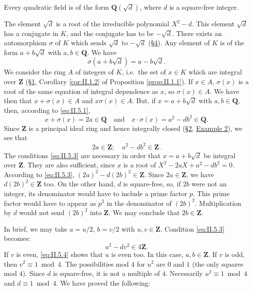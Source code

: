 \begin{proposition}
\label{prop:II.5.1}
Every quadratic field is of the form $\mathbf{Q}(\sqrt{d})$, where $d$ is a
square-free integer.
\end{proposition}

The element $\sqrt{d}$ is a root of the irreducible polynomial $X^{2}-d$.
This element $\sqrt{d}$ has a conjugate in $K$, and the conjugate has to be
$-\sqrt{d}$. There exists an automorphism $\sigma$ of $K$ which sends
$\sqrt{d}$ to $-\sqrt{d}$ (\hyperref[sec:2.4]{§4}). Any element of $K$ is of the form
$a+b\sqrt{d}$ with $a,b\in\mathbf{Q}$. We have
\begin{equation}
\sigma(a+b\sqrt{d})=a-b\sqrt{d}.
\label{eq:II.5.1}
\end{equation}
We consider the ring $A$ of integers of $K$, i.e.\ the set of $x\in K$ which
are integral over $\mathbf{Z}$ (\hyperref[sec:2.1]{§1}, Corollary \ref{cor:II.1.2} of
Proposition \ref{prop:II.1.1}). If $x\in A$, $\sigma(x)$ is a root of the
same equation of integral dependence as $x$, so $\sigma(x)\in A$. We have
then that $x+\sigma(x)\in A$ and $x\sigma(x)\in A$. But, if
$x=a+b\sqrt{d}$ with $a,b\in\mathbf{Q}$, then, according to \eqref{eq:II.5.1},
\begin{equation}
x+\sigma(x)=2a\in\mathbf{Q}\quad\text{and}\quad
x\cdot\sigma(x)=a^{2}-db^{2}\in\mathbf{Q}.
\label{eq:II.5.2}
\end{equation}
Since $\mathbf{Z}$ is a principal ideal ring and hence integrally closed
(\hyperref[sec:2.2]{§2}, \hyperref[exa:II.2.2]{Example 2}), we see that
\begin{equation}
2a\in\mathbf{Z};\quad a^{2}-db^{2}\in\mathbf{Z}.
\label{eq:II.5.3}
\end{equation}
The conditions \eqref{eq:II.5.3} are necessary in order that
$x=a+b\sqrt{d}$ be integral over $\mathbf{Z}$. They are also sufficient,
since $x$ is a root of $X^{2}-2aX+a^{2}-db^{2}=0$. According to
\eqref{eq:II.5.3}, $(2a)^{2}-d(2b)^{2}\in\mathbf{Z}$. Since
$2a\in\mathbf{Z}$, we have $d(2b)^{2}\in\mathbf{Z}$ too. On the other hand,
$d$ is square-free, so, if $2b$ were not an integer, its denominator would
have to include a prime factor $p$. This prime factor would have to appear as
$p^{2}$ in the denominator of $(2b)^{2}$. Multiplication by $d$ would not
send $(2b)^{2}$ into $\mathbf{Z}$. We may conclude that $2b\in\mathbf{Z}$.

In brief, we may take $a=u/2$, $b=v/2$ with $u,v\in\mathbf{Z}$. Condition
\eqref{eq:II.5.3} becomes:
\begin{equation}
u^{2}-dv^{2}\in4\mathbf{Z}.
\label{eq:II.5.4}
\end{equation}
If $v$ is even, \eqref{eq:II.5.4} shows that $u$ is even too. In this case,
$a,b\in\mathbf{Z}$. If $v$ is odd, then $v^{2}\equiv1\bmod4$. The
possibilities mod $4$ for $u^{2}$ are $0$ and $1$ (the only squares mod $4$).
Since $d$ is square-free, it is not a multiple of $4$. Necessarily
$u^{2}\equiv1\bmod4$ and $d\equiv1\bmod4$. We have proved the following:

